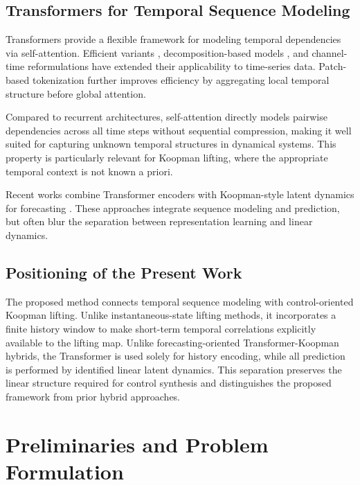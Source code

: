\documentclass[journal]{IEEEtran}
\begin{document}
\subsection{Transformers for Temporal Sequence Modeling}

Transformers \cite{vaswani2017attention} provide a flexible framework for modeling temporal dependencies via self-attention. Efficient variants \cite{zhou2021informer, wang2020linformer, katharopoulos2020transformers, choromanski2021performer}, decomposition-based models \cite{wu2021autoformer, zhou2022fedformer}, and channel-time reformulations \cite{zeng2023transformers, liu2024itransformer} have extended their applicability to time-series data. Patch-based tokenization \cite{nie2023time} further improves efficiency by aggregating local temporal structure before global attention.

Compared to recurrent architectures, self-attention directly models pairwise dependencies across all time steps without sequential compression, making it well suited for capturing unknown temporal structures in dynamical systems. This property is particularly relevant for Koopman lifting, where the appropriate temporal context is not known a priori.

Recent works combine Transformer encoders with Koopman-style latent dynamics for forecasting \cite{forootani2026deepkoopformer, forootani2026spectral}. These approaches integrate sequence modeling and prediction, but often blur the separation between representation learning and linear dynamics.

\subsection{Positioning of the Present Work}
\label{subsec:positioning}

The proposed method connects temporal sequence modeling with control-oriented Koopman lifting. Unlike instantaneous-state lifting methods, it incorporates a finite history window to make short-term temporal correlations explicitly available to the lifting map. Unlike forecasting-oriented Transformer-Koopman hybrids, the Transformer is used solely for history encoding, while all prediction is performed by identified linear latent dynamics. This separation preserves the linear structure required for control synthesis and distinguishes the proposed framework from prior hybrid approaches.

\section{Preliminaries and Problem Formulation}
\label{sec:preliminaries_and_problem}
\end{document}
